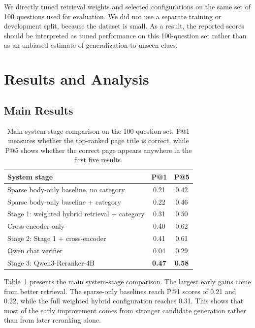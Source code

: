 \documentclass[11pt]{article}
\begin{document}
We directly tuned retrieval weights and selected configurations on the same set of 100 questions used for evaluation. We did not use a separate training or development split, because the dataset is small. As a result, the reported scores should be interpreted as tuned performance on this 100-question set rather than as an unbiased estimate of generalization to unseen clues.

\section{Results and Analysis}

\subsection{Main Results}
\label{sec:results}



\begin{table}[t]
  \centering
  \small
  \caption{Main system-stage comparison on the 100-question set. P@1 measures whether the top-ranked page title is correct, while P@5 shows whether the correct page appears anywhere in the first five results.}
  \label{tab:main-results}
  \begin{tabular}{lcc}
    \toprule
    \textbf{System stage} & \textbf{P@1} & \textbf{P@5} \\
    \midrule
    Sparse body-only baseline, no category & 0.21 & 0.42 \\
    Sparse body-only baseline + category & 0.22 & 0.46 \\
    Stage 1: weighted hybrid retrieval + category & 0.31 & 0.50 \\
    Cross-encoder only & 0.40 & 0.62 \\
    Stage 2: Stage 1 + cross-encoder & 0.41 & 0.61 \\
    Qwen chat verifier & 0.04 & 0.29 \\
    Stage 3: Qwen3-Reranker-4B & \textbf{0.47} & \textbf{0.58} \\
    \bottomrule
  \end{tabular}
\end{table}

Table~\ref{tab:main-results} presents the main system-stage comparison. The largest early gains come from better retrieval. 
The sparse-only baselines reach P@1 scores of 0.21 and 0.22, while the full weighted hybrid configuration reaches 0.31. 
This shows that most of the early improvement comes from stronger candidate generation rather than from later reranking alone.
\end{document}

